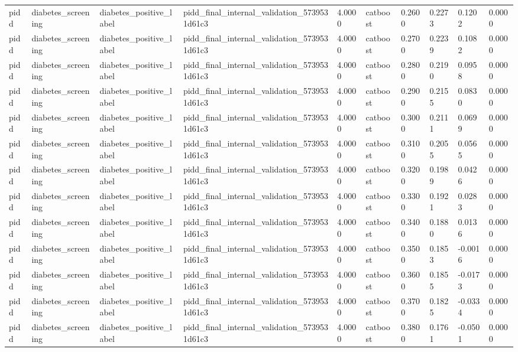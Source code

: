 \begin{tabular}{llllllllll}
pidd & diabetes\_screening & diabetes\_positive\_label & pidd\_final\_internal\_validation\_5739531d61c3 & 4.0000 & catboost & 0.2600 & 0.2273 & 0.1202 & 0.0000 \\
pidd & diabetes\_screening & diabetes\_positive\_label & pidd\_final\_internal\_validation\_5739531d61c3 & 4.0000 & catboost & 0.2700 & 0.2239 & 0.1082 & 0.0000 \\
pidd & diabetes\_screening & diabetes\_positive\_label & pidd\_final\_internal\_validation\_5739531d61c3 & 4.0000 & catboost & 0.2800 & 0.2190 & 0.0958 & 0.0000 \\
pidd & diabetes\_screening & diabetes\_positive\_label & pidd\_final\_internal\_validation\_5739531d61c3 & 4.0000 & catboost & 0.2900 & 0.2155 & 0.0830 & 0.0000 \\
pidd & diabetes\_screening & diabetes\_positive\_label & pidd\_final\_internal\_validation\_5739531d61c3 & 4.0000 & catboost & 0.3000 & 0.2111 & 0.0699 & 0.0000 \\
pidd & diabetes\_screening & diabetes\_positive\_label & pidd\_final\_internal\_validation\_5739531d61c3 & 4.0000 & catboost & 0.3100 & 0.2055 & 0.0565 & 0.0000 \\
pidd & diabetes\_screening & diabetes\_positive\_label & pidd\_final\_internal\_validation\_5739531d61c3 & 4.0000 & catboost & 0.3200 & 0.1989 & 0.0426 & 0.0000 \\
pidd & diabetes\_screening & diabetes\_positive\_label & pidd\_final\_internal\_validation\_5739531d61c3 & 4.0000 & catboost & 0.3300 & 0.1921 & 0.0283 & 0.0000 \\
pidd & diabetes\_screening & diabetes\_positive\_label & pidd\_final\_internal\_validation\_5739531d61c3 & 4.0000 & catboost & 0.3400 & 0.1880 & 0.0136 & 0.0000 \\
pidd & diabetes\_screening & diabetes\_positive\_label & pidd\_final\_internal\_validation\_5739531d61c3 & 4.0000 & catboost & 0.3500 & 0.1853 & -0.0016 & 0.0000 \\
pidd & diabetes\_screening & diabetes\_positive\_label & pidd\_final\_internal\_validation\_5739531d61c3 & 4.0000 & catboost & 0.3600 & 0.1855 & -0.0173 & 0.0000 \\
pidd & diabetes\_screening & diabetes\_positive\_label & pidd\_final\_internal\_validation\_5739531d61c3 & 4.0000 & catboost & 0.3700 & 0.1825 & -0.0334 & 0.0000 \\
pidd & diabetes\_screening & diabetes\_positive\_label & pidd\_final\_internal\_validation\_5739531d61c3 & 4.0000 & catboost & 0.3800 & 0.1761 & -0.0501 & 0.0000 \\

\end{tabular}
